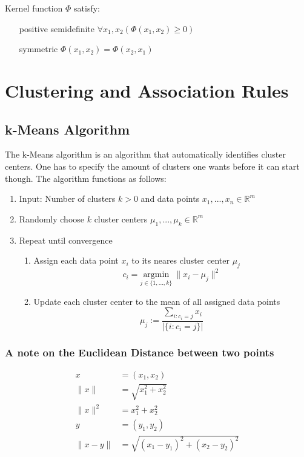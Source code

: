 \documentclass[11pt]{article}
\begin{document}
Kernel function $\Phi$ satisfy:
\begin{enumerate}[leftmargin=*, labelindent=5cm, labelsep=0.5cm]
    \item[positive semidefinite]$\forall x_1,x_2(\Phi(x_1,x_2)\geq 0)$
    \item[symmetric] $\Phi(x_1,x_2) = \Phi(x_2,x_1)$
\end{enumerate}

\section{Clustering and Association Rules}

\subsection{k-Means Algorithm}

The k-Means algorithm is an algorithm that automatically identifies cluster centers. One has to specify the amount of clusters one wants before it can start though. The algorithm functions as follows:

\begin{enumerate}
    \item Input: Number of clusters $k>0$ and data points $x_1,...,x_n \in \mathbb{R}^m$
    \item Randomly choose $k$ cluster centers $\mu_1,...,\mu_k \in \mathbb{R}^m$
    \item Repeat until convergence
          \begin{enumerate}
              \item Assign each data point $x_i$ to its neares cluster center $\mu_j$
                    \begin{equation*}
                        c_i = \underset{j\in\{1,...,k\}}{\text{argmin}}\ \| x_i - \mu_j \|^2
                    \end{equation*}
              \item  Update each cluster center to the mean of all assigned data points
                    \begin{equation*}
                        \mu_j := \frac{\sum_{i:c_i=j} x_i}{|\{i:c_i = j\}|}
                    \end{equation*}
          \end{enumerate}
\end{enumerate}

\subsubsection{A note on the Euclidean Distance between two points}
\begin{align*}
    x           & = (x_1,x_2)                            \\
    \| x \|     & = \sqrt{x_1^2 + x_2^2}                 \\
    \| x \|^2   & = x_1^2 + x_2^2                        \\
    y           & = (y_1, y_2)                           \\
    \| x - y \| & = \sqrt{(x_1 - y_1)^2 + (x_2 - y_2)^2}
\end{align*}
\end{document}
